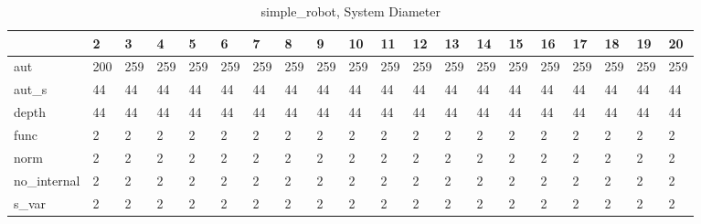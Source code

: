 \begin{table}
\centering
\caption{simple_robot, System Diameter}
\label{simple_robot_diam}
\begin{tabular}{llllllllllllllllllll}
\toprule
{} &    2 &    3 &    4 &    5 &    6 &    7 &    8 &    9 &   10 &   11 &   12 &   13 &   14 &   15 &   16 &   17 &   18 &   19 &   20 \\
\midrule
aut         &  200 &  259 &  259 &  259 &  259 &  259 &  259 &  259 &  259 &  259 &  259 &  259 &  259 &  259 &  259 &  259 &  259 &  259 &  259 \\
aut\_s       &   44 &   44 &   44 &   44 &   44 &   44 &   44 &   44 &   44 &   44 &   44 &   44 &   44 &   44 &   44 &   44 &   44 &   44 &   44 \\
depth       &   44 &   44 &   44 &   44 &   44 &   44 &   44 &   44 &   44 &   44 &   44 &   44 &   44 &   44 &   44 &   44 &   44 &   44 &   44 \\
func        &    2 &    2 &    2 &    2 &    2 &    2 &    2 &    2 &    2 &    2 &    2 &    2 &    2 &    2 &    2 &    2 &    2 &    2 &    2 \\
norm        &    2 &    2 &    2 &    2 &    2 &    2 &    2 &    2 &    2 &    2 &    2 &    2 &    2 &    2 &    2 &    2 &    2 &    2 &    2 \\
no\_internal &    2 &    2 &    2 &    2 &    2 &    2 &    2 &    2 &    2 &    2 &    2 &    2 &    2 &    2 &    2 &    2 &    2 &    2 &    2 \\
s\_var       &    2 &    2 &    2 &    2 &    2 &    2 &    2 &    2 &    2 &    2 &    2 &    2 &    2 &    2 &    2 &    2 &    2 &    2 &    2 \\
\bottomrule
\end{tabular}
\end{table}
